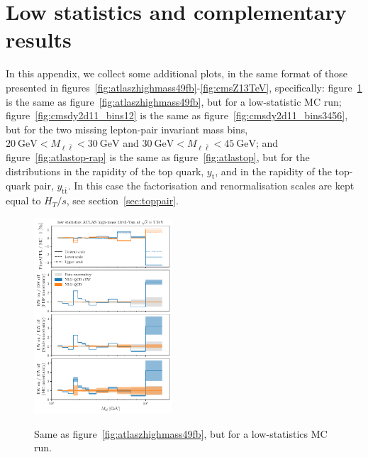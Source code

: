 \section{Low statistics and complementary results}
\label{app:add_plots}

In this appendix, we collect some additional plots, in the same format of those
presented in figures~\ref{fig:atlaszhighmass49fb}-\ref{fig:cmsZ13TeV},
specifically: figure~\ref{fig:atlaszhighmass49fb-lowstat} is the same as
figure~\ref{fig:atlaszhighmass49fb}, but for a low-statistic MC run;
figure~\ref{fig:cmsdy2d11_bins12} is the same as
figure~\ref{fig:cmsdy2d11_bins3456}, but for the two missing lepton-pair
invariant mass bins,
$\SI{20}{\giga\electronvolt}<M_{\ell\bar\ell}<\SI{30}{\giga\electronvolt}$ and
$\SI{30}{\giga\electronvolt}<M_{\ell\bar\ell}<\SI{45}{\giga\electronvolt}$;
and figure~\ref{fig:atlastop-rap} is the same as figure~\ref{fig:atlastop},
but for the distributions in the rapidity of the top quark, $y_{\mathrm{t}}$,
and in the rapidity of the top-quark pair, $y_{\mathrm{t}\bar{\mathrm{t}}}$. In this
case the factorisation and renormalisation scales are kept equal to
$H_T/s$, see section~\ref{sec:toppair}.

\begin{figure}[!t]
    \centering
    \includegraphics[width=0.46\textwidth]{figures/pineappl_ATLASZHIGHMASS49FB_lowstat}\\
    \caption{Same as figure~\ref{fig:atlaszhighmass49fb}, but for a
    low-statistics MC run.}
    \label{fig:atlaszhighmass49fb-lowstat}
\end{figure}

